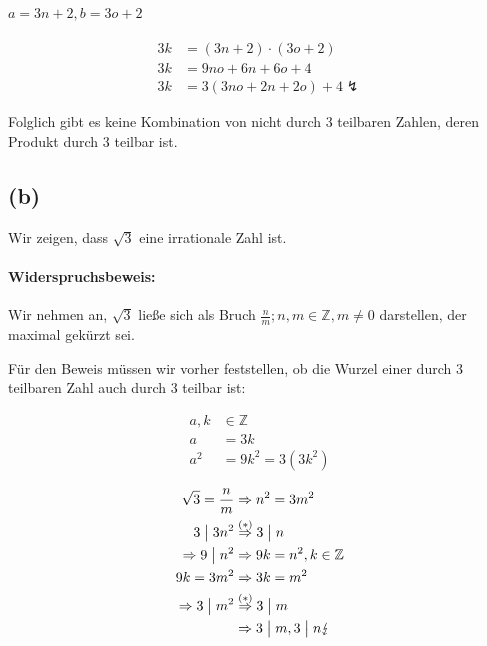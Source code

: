\documentclass[11pt,a4paper]{article}
\begin{document}
\paragraph{$a = 3n+2, b = 3o+2$}
\begin{align*}
    3k &= (3n+2) \cdot (3o+2)\\
    3k &= 9no + 6n + 6o + 4\\
    3k &= 3(3no + 2n + 2o) + 4 \lightning
\end{align*}

Folglich gibt es keine Kombination von nicht durch $3$ teilbaren Zahlen, deren Produkt durch $3$ teilbar ist. \checkmark

\subsection*{(b)}
Wir zeigen, dass $\sqrt{3}$ eine irrationale Zahl ist.

\paragraph{Widerspruchsbeweis:}
Wir nehmen an, $\sqrt{3}$ ließe sich als Bruch $\frac{n}{m}; n, m \in \mathbb{Z}, m \neq 0$ darstellen, der maximal gekürzt sei.

Für den Beweis müssen wir vorher feststellen, ob die Wurzel einer durch $3$ teilbaren Zahl auch durch $3$ teilbar ist:

\begin{align*}
a, k &\in \mathbb{Z}\\
a &= 3k\\
a^2 &= 9k^2 = 3(3k^2) \tag*{\checkmark $(\ast)$}
\end{align*}

\begin{align*}
\sqrt{3} = \frac{n}{m} &\Rightarrow n^2 = 3m^2\\
3 \bigm| 3n^2 &\stackrel{(\ast)}{\Rightarrow} 3 \bigm| n\\
\Rightarrow 9 \bigm| n^2 &\Rightarrow 9k = n^2, k \in \mathbb{Z}\\
9k = 3m^2 &\Rightarrow 3k = m^2\\
\Rightarrow 3 \bigm| m^2 &\stackrel{(\ast)}{\Rightarrow} 3 \bigm| m\\
&\Rightarrow 3 \bigm| m, 3 \bigm| n \lightning
\end{align*}

\section{} %
\end{document}
